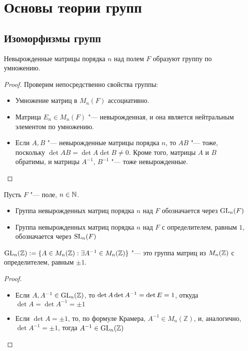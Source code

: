 \section{Основы теории групп}
	
\subsection{Изоморфизмы групп}

\begin{proposition}
	Невырожденные матрицы порядка $n$ над полем $F$ образуют группу по умножению.
\end{proposition}

\begin{proof}
	Проверим непосредственно свойства группы:
	\begin{itemize}
		\item Умножение матриц в $M_n(F)$ ассоциативно.
		\item Матрица $E_n \in M_n(F)$ "--- невырожденная, и она является нейтральным элементом по умножению.
		\item Если $A, B$ "--- невырожденные матрицы порядка $n$, то $AB$ "--- тоже, поскольку $\det{AB} = \det{A}\det{B} \ne 0$. Кроме того, матрицы $A$ и $B$ обратимы, и матрицы $A^{-1}$, $B^{-1}$ "--- тоже невырожденные.\qedhere
	\end{itemize}
\end{proof}

\begin{definition}
	Пусть $F$ "--- поле, $n \in \mathbb{N}$.
	\begin{itemize}
		\item Группа невырожденных матриц порядка $n$ над $F$ обозначается через $\operatorname{GL}_n(F)$
		\item Группа невырожденных матриц порядка $n$ над $F$ с определителем, равным $1$, обозначается через $\operatorname{SL}_n(F)$
	\end{itemize}
\end{definition}

\begin{proposition}
	$\operatorname{GL}_n(\mathbb{Z}) := \{A \in M_n(\mathbb{Z}): \exists A^{-1} \in M_n(\mathbb{Z})\}$ "--- это группа матриц из $M_n(\mathbb{Z})$ с определителем, равным $\pm1$.
\end{proposition}

\begin{proof}~
	\begin{itemize}
		\item Если $A, A^{-1} \in \operatorname{GL}_n(\mathbb{Z})$, то $\det{A}\det{A^{-1}} = \det{E} \hm{=} 1$, откуда $\det{A} = \det{A^{-1}} = \pm1$
		\item Если $\det{A} = \pm 1$, то, по формуле Крамера, $A^{-1} \in M_n(\mathbb{Z})$, и, аналогично, $\det{A^{-1}} = \pm1$, тогда $A^{-1} \in \operatorname{GL}_n(\mathbb{Z})$\qedhere
	\end{itemize}
\end{proof}

